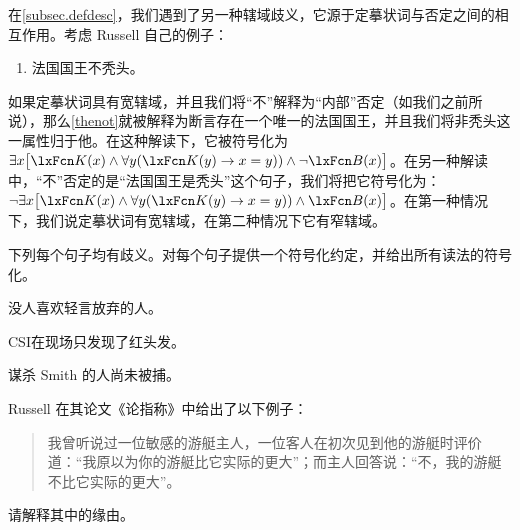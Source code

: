 在\cref{subsec.defdesc}，我们遇到了另一种辖域歧义，它源于定摹状词与否定之间的相互作用。考虑 Russell 自己的例子：
\begin{enumerate}
	\item\label{thenot} 法国国王不秃头。
\end{enumerate}
如果定摹状词具有宽辖域，并且我们将“不”解释为“内部”否定（如我们之前所说），那么\cref*{thenot}就被解释为断言存在一个唯一的法国国王，并且我们将非秃头这一属性归于他。在这种解读下，它被符号化为$\exists x\bigl[\atom{K}{x} \eand \forall y(\atom{K}{y} \eif x=y)) \eand \enot \atom{B}{x}\bigr]$。在另一种解读中，“不”否定的是“法国国王是秃头”这个句子，我们将把它符号化为：$\enot\exists x\bigl[\atom{K}{x} \eand \forall y(\atom{K}{y} \eif x=y)) \eand \atom{B}{x}\bigr]$。在第一种情况下，我们说定摹状词有宽辖域，在第二种情况下它有窄辖域。

\practiceproblems
\problempart
下列每个句子均有歧义。对每个句子提供一个符号化约定，并给出所有读法的符号化。
\begin{compactlist}
	\item 没人喜欢轻言放弃的人。
	\item CSI在现场只发现了红头发。
	\item 谋杀 Smith 的人尚未被捕。
\end{compactlist}

\problempart
Russell 在其论文《论指称》中给出了以下例子：
\begin{quote}
	我曾听说过一位敏感的游艇主人，一位客人在初次见到他的游艇时评价道：“我原以为你的游艇比它实际的更大”；而主人回答说：“不，我的游艇不比它实际的更大”。
\end{quote}
请解释其中的缘由。
